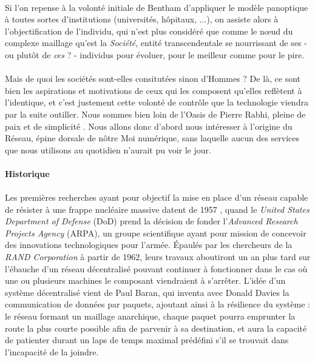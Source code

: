 \paragraph{} Si l'on repense à la volonté initiale de Bentham d'appliquer le modèle panoptique à toutes sortes d'institutions
(universités, hôpitaux, ...), on assiste alors à l'objectification de l'individu, qui n'est plus considéré que comme le 
n\oe{}ud du complexe maillage qu'est la \emph{Société}, entité transcendentale se nourrissant de ses - ou plutôt de 
\emph{ces} ? - individus pour évoluer, pour le meilleur comme pour le pire.

\paragraph{} Mais de quoi les sociétés sont-elles consitutées sinon d'Hommes ? De là, ce sont bien les aspirations et 
motivations de ceux qui les composent qu'elles reflètent à l'identique, et c'est justement cette volonté de contrôle que
la technologie viendra par la suite outiller. Nous sommes bien loin de l'Oasis de Pierre Rabhi, pleine de paix et de
simplicité \cite{Rabhi1}. Nous allons donc d'abord nous intéresser à l'origine du Réseau, épine dorsale de nôtre Moi 
numérique, sans laquelle aucun des services que nous utilisons au quotidien n'aurait pu voir le jour.


\paragraph{Historique}

\paragraph{} Les premières recherches ayant pour objectif la mise en place d'un réseau capable de résister à une frappe
nucléaire massive datent de 1957 \cite{Internet0}, quand le \emph{United States Department of Defense} (DoD) prend la
décision de fonder l'\emph{Advanced Research Projects Agency} (ARPA), un groupe scientifique ayant pour mission de concevoir
des innovations technologiques pour l'armée. Épaulés par les chercheurs de la \emph{RAND Corporation} à partir de 1962,
leurs travaux aboutiront un an plus tard sur l'ébauche d'un réseau décentralisé pouvant continuer à fonctionner dans le
cas où une ou plusieurs machines le composant viendraient à s'arrêter. L'idée d'un système décentralisé vient de Paul Baran,
qui inventa avec Donald Davies la communication de données par paquets, ajoutant ainsi à la résilience du système : le réseau
formant un maillage anarchique, chaque paquet pourra emprunter la route la plus courte possible afin de parvenir à sa 
destination, et aura la capacité de patienter durant un laps de temps maximal prédéfini s'il se trouvait dans l'incapacité
de la joindre.

